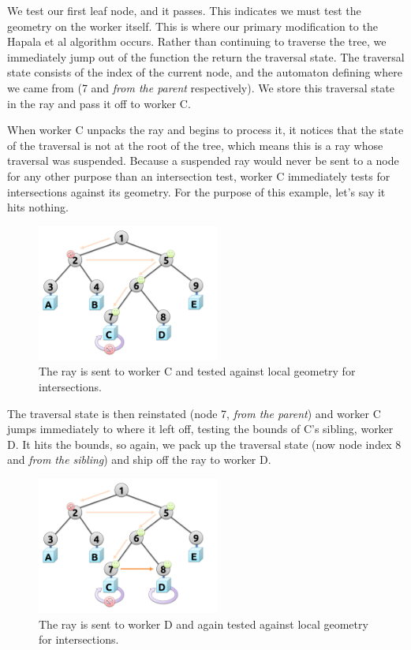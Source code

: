 \documentclass[a4paper,twoside]{article}
\begin{document}
We test our first leaf node, and it passes. This indicates we must test the
geometry on the worker itself. This is where our primary modification to the
Hapala et al \cite{hapala:2011} algorithm occurs. Rather than continuing to
traverse the tree, we immediately jump out of the function the return the
traversal state. The traversal state consists of the index of the current
node, and the automaton defining where we came from (7 and \emph{from the parent}
respectively). We store this traversal state in the ray and pass it off to worker
C.

When worker C unpacks the ray and begins to process it, it notices that the
state of the traversal is not at the root of the tree, which means this is a
ray whose traversal was suspended. Because a suspended ray would never be sent
to a node for any other purpose than an intersection test, worker C immediately
tests for intersections against its geometry. For the purpose of this example,
let's say it hits nothing.

\begin{figure}[h!]
    \centering
    \includegraphics[width=60mm]{figures/traversal4.pdf}
    \caption{The ray is sent to worker C and tested against local geometry for intersections.}
    \label{fig:traversal4}
\end{figure}

The traversal state is then reinstated (node 7, \emph{from the parent}) and
worker C jumps immediately to where it left off, testing the bounds of C's
sibling, worker D. It hits the bounds, so again, we pack up the traversal
state (now node index 8 and \emph{from the sibling}) and ship off the ray to
worker D.

\begin{figure}[h!]
    \centering
    \includegraphics[width=60mm]{figures/traversal5.pdf}
    \caption{The ray is sent to worker D and again tested against local geometry for intersections.}
    \label{fig:traversal5}
\end{figure}
\end{document}

